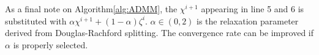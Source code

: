 As a final note on Algorithm\cref{alg:ADMM}, the $\chi^{i+1}$ appearing in line 5 and 6 is substituted with $\alpha \chi^{i+1}+(1-\alpha )\zeta^{i}$.
$\alpha \in (0,2)$ is the relaxation parameter derived from Douglas-Rachford splitting. The convergence rate can be improved if $\alpha$ is properly selected. %